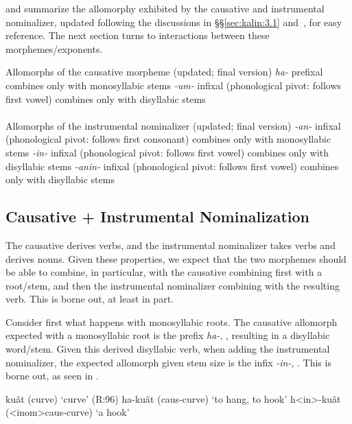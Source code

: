 \documentclass[output=paper]{langscibook}
\begin{document}
\Next and \NNext summarize the allomorphy exhibited by the causative and instrumental nominalizer, updated following the discussions in \S\S\ref{sec:kalin:3.1} and~, for easy reference. The next section turns to interactions between these morphemes/exponents.

\ea Allomorphs of the causative morpheme (updated; final version) \label{kalincausallos2}
\ea \textit{ha-}
\ea  prefixal
\ex combines only with monosyllabic stems
\z
\ex \textit{-um-} \label{kalincausallosb2}
\ea infixal (phonological pivot: follows first vowel)
\ex combines only with disyllabic stems\\~\\
\z
\z
\ex Allomorphs of the instrumental nominalizer (updated; final version)  \label{kalininstallos2}
\ea \textit{-an-} \label{kalininstallosb2}
\ea  infixal (phonological pivot: follows first consonant)
\ex combines only with monosyllabic stems
\z
\ex \textit{-in-} \label{kalininstallosa2}
\ea infixal (phonological pivot: follows first vowel)
\ex combines only with disyllabic stems
\z
\ex \textit{-anin-} \label{kalininstallosc2}
\ea infixal (phonological pivot: follows first vowel)
\ex combines only with disyllabic stems
\z
\z
\z

\subsection{Causative + Instrumental Nominalization}\label{sec:kalin:3.4}

The causative derives verbs, and the instrumental nominalizer takes verbs and derives nouns. Given these properties, we expect that the two morphemes should be able to combine, in particular, with the causative combining first with a root/stem, and then the instrumental nominalizer combining with the resulting verb. This is borne out, at least in part. 

Consider first what happens with monosyllabic roots. The causative allomorph expected with a monosyllabic root is the prefix \textit{ha-}, , resulting in a disyllabic word/stem. Given this derived disyllabic verb, when adding the instrumental nominalizer, the expected allomorph given stem size is the infix \textit{-in-}, . This is borne out, as seen in \Next.

\ea 
\ea ku\~at (curve) \hfill `curve'  (R:96)
\ex ha-ku\~at ({\sc caus-}curve) \hfill `to hang, to hook'
\ex\label{kalininstcaus} h<in>-ku\~at ({\sc <inom>caus-}curve) \hfill `a hook'
\z
\z
\end{document}
